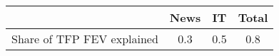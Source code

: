 \begin{small}
	\begin{tabular}{lccc}
	\hline
		& News & IT & Total \\
		\hline
		Share of TFP FEV explained & 0.3 & 0.5 & 0.8 \\
		\hline
	\end{tabular}
\end{small}
